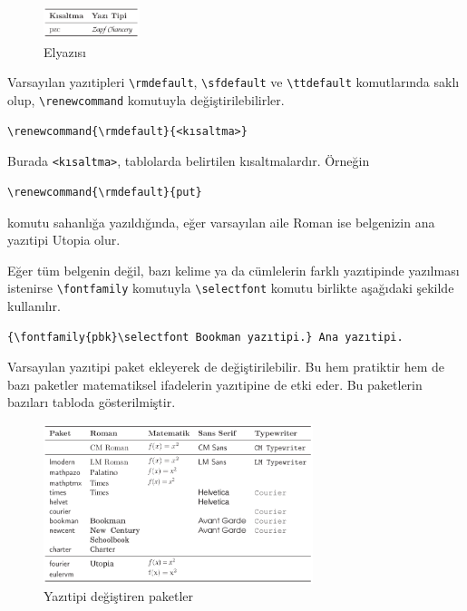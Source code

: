 \documentclass[
  10pt,
]{scrbook}
\theoremstyle{definition}
\theoremstyle{definition}
\theoremstyle{definition}
\theoremstyle{definition}
\theoremstyle{remark}
\begin{document}
\begin{figure}
\centering
\includegraphics[width=0.25\textwidth,height=\textheight]{images/yazitipi5.png}
\caption{Elyazısı}
\end{figure}

Varsayılan yazıtipleri \texttt{\textbackslash{}rmdefault}, \texttt{\textbackslash{}sfdefault} ve \texttt{\textbackslash{}ttdefault} komutlarında saklı olup, \texttt{\textbackslash{}renewcommand} komutuyla değiştirilebilirler.

\begin{verbatim}
\renewcommand{\rmdefault}{<kısaltma>}
\end{verbatim}

Burada \texttt{\textless{}kısaltma\textgreater{}}, tablolarda belirtilen kısaltmalardır. Örneğin

\begin{verbatim}
\renewcommand{\rmdefault}{put}
\end{verbatim}

komutu sahanlığa yazıldığında, eğer varsayılan aile Roman ise belgenizin ana yazıtipi Utopia olur.

Eğer tüm belgenin değil, bazı kelime ya da cümlelerin farklı yazıtipinde yazılması istenirse \texttt{\textbackslash{}fontfamily} komutuyla \texttt{\textbackslash{}selectfont} komutu birlikte aşağıdaki şekilde kullanılır.

\begin{verbatim}
{\fontfamily{pbk}\selectfont Bookman yazıtipi.} Ana yazıtipi.
\end{verbatim}

Varsayılan yazıtipi paket ekleyerek de değiştirilebilir. Bu hem pratiktir hem de bazı paketler matematiksel ifadelerin yazıtipine de etki eder. Bu paketlerin bazıları tabloda gösterilmiştir.

\begin{figure}
\centering
\includegraphics[width=0.7\textwidth,height=\textheight]{images/yazitipi6.png}
\caption{Yazıtipi değiştiren paketler}
\end{figure}
\end{document}
